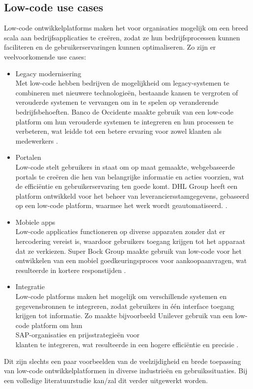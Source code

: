 \subsection{Low-code use cases}
Low-code ontwikkelplatforms maken het voor organisaties mogelijk om een breed scala aan bedrijfsapplicaties te creëren, zodat ze hun bedrijfsprocessen kunnen faciliteren en de gebruikerservaringen kunnen optimaliseren.
Zo zijn er veelvoorkomende use cases:
\begin{itemize}
    \item Legacy modernisering 
    \\
    Met low-code hebben bedrijven de mogelijkheid om legacy-systemen te combineren met nieuwere technologieën, bestaande kansen te vergroten of verouderde systemen te vervangen om in te spelen op veranderende bedrijfsbehoeften. Banco de Occidente maakte gebruik van een low-code platform om hun verouderde systemen te integreren en hun processen te verbeteren, wat leidde tot een betere ervaring voor zowel klanten als medewerkers \autocite{Bunce2024a}.
    \item Portalen
    \\
    Low-code stelt gebruikers in staat om op maat gemaakte, webgebaseerde portals te creëren die hen van belangrijke informatie en acties voorzien, wat de efficiëntie en gebruikerservaring ten goede komt. DHL Group heeft een platform ontwikkeld voor het beheer van leveranciersstamgegevens, gebaseerd op een low-code platform, waarmee het werk wordt geautomatiseerd. \autocite{Bunce2024a} .
    \item Mobiele apps
    \\
    Low-code applicaties functioneren op diverse apparaten zonder dat er hercodering vereist is, waardoor gebruikers toegang krijgen tot het apparaat dat ze verkiezen. Super Bock Group maakte gebruik van low-code voor het ontwikkelen van een mobiel goedkeuringsproces voor aankoopaanvragen, wat resulteerde in kortere responstijden \autocite{Bunce2024a}.
    \item Integratie
    \\
    Low-code platforms maken het mogelijk om verschillende systemen en gegevensbronnen te integreren, zodat gebruikers in één interface toegang krijgen tot informatie. Zo maakte bijvoorbeeld Unilever gebruik van een low-code platform om hun \\SAP-organisaties en prijsstrategieën voor \\klanten te integreren, wat resulteerde in een hogere efficiëntie en precisie \autocite{Bunce2024a}.
\end{itemize}
Dit zijn slechts een paar voorbeelden van de veelzijdigheid en brede toepassing van low-code ontwikkelplatformen in diverse industrieën en gebruikssituaties. Bij een volledige literatuurstudie kan/zal dit verder uitgewerkt worden.

